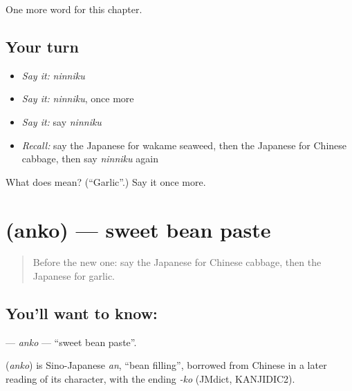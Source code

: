 \begin{grammarlens}[title={What you've built}]
One more word for this chapter.
\end{grammarlens}

\subsection*{Your turn}
\begin{itemize}
\raggedright
  \item \emph{Say it:} \emph{ninniku}
  \item \emph{Say it:} \emph{ninniku}, once more
  \item \emph{Say it:} say \emph{ninniku}
  \item \emph{Recall:} say the Japanese for wakame seaweed, then the Japanese for Chinese cabbage, then say \emph{ninniku} again
\end{itemize}

\begin{tcolorbox}[breakable,colback=teal!4,colframe=teal!35!black,title={Before you move on}]
What does  mean? (\textquotedblleft{}Garlic\textquotedblright{}.) Say it once more.
\end{tcolorbox}
\section[\texorpdfstring{\ja{あんこ} (anko)}{あんこ (anko)}]{ (anko) — sweet bean paste}

\label{lesson:JA-C114-anko}



\begin{quote}
Before the new one: say the Japanese for Chinese cabbage, then the Japanese for garlic.
\end{quote}

\subsection*{You'll want to know: }
\textbf{} — \emph{anko} — \textquotedblleft{}sweet bean paste\textquotedblright{}.

\begin{cousinweb}
\textbf{} (\emph{anko}) is Sino-Japanese \emph{an}, \textquotedblleft{}bean filling\textquotedblright{}, borrowed from Chinese in a later reading of its character, with the ending \emph{-ko} (JMdict, KANJIDIC2).
\end{cousinweb}

